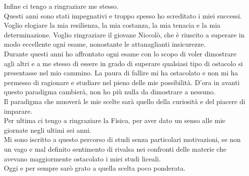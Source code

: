 Infine ci tengo a ringraziare me stesso.\\ 
Questi anni sono stati impegnativi e troppo spesso ho screditato i miei successi.
Voglio elogiare la mia resilienza, la mia costanza, la mia tenacia e la mia determinazione.
Voglio ringraziare il giovane Niccolò, che è riuscito a superare in modo eccellente ogni esame, nonostante le 
attanaglianti insicurezze.\\
Durante questi anni ho affrontato ogni esame con lo scopo di voler dimostrare agli altri e a 
me stesso di essere in grado di superare qualsiasi tipo di ostacolo si presentasse nel mio cammino.
La paura di fallire mi ha ostacolato e non mi ha permesso di ragionare e studiare nel pieno delle mie possibilità.
D'ora in avanti questo paradigma cambierà, non ho più nulla da dimostrare a nessuno.\\
Il paradigma che muoverà le mie scelte sarà quello della curiosità e del piacere di imparare.\\

Per ultima ci tengo a ringraziare la Fisica, per aver dato un senso alle mie giornate negli ultimi sei anni.\\
Mi sono iscritto a questo percorso di studi senza particolari motivazioni, se non un vago e mal definito sentimento 
di rivalsa nei confronti delle materie che avevano maggiormente ostacolato i miei studi liceali.\\
Oggi e per sempre sarò grato a quella scelta poco ponderata.\\

